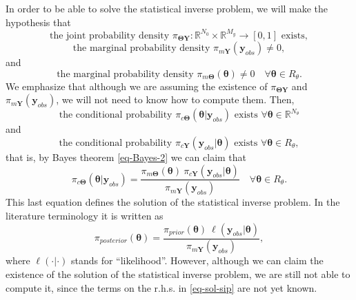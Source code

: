 In order to be able to solve the statistical inverse problem, we will make the hypothesis that
\begin{equation}\label{eq-hyp-jpd}
\mbox{the joint probability density }\pi_{\boldsymbol{\Theta}\mathbf{Y}}:\mathbb{R}^{N_0}\times\mathbb{R}^{M_y}\rightarrow[0,1]\mbox{ exists},
\end{equation}
\begin{equation}\label{eq-hyp-obs-mp}
\mbox{the marginal probability density }\pi_{m\mathbf{Y}}(\mathbf{y}_{obs})\neq 0,
\end{equation}
and
\begin{equation}\label{eq-hyp-theta-mp}
\mbox{the marginal probability density }\pi_{m\boldsymbol{\Theta}}(\boldsymbol{\theta})\neq 0\quad\forall\boldsymbol\theta\in R_{\theta}.
\end{equation}
We emphasize that although we are assuming the existence of
$\pi_{\boldsymbol{\Theta}\mathbf{Y}}$ and
$\pi_{m\mathbf{Y}}(\mathbf{y}_{obs})$,
we will not need to know how to compute them.
Then,
\begin{equation*}
\mbox{the conditional probability }\pi_{c\boldsymbol\Theta}(\boldsymbol\theta|\mathbf{y}_{obs})\mbox{ exists }\forall\boldsymbol\theta\in\mathbb{R}^{N_\theta}
\end{equation*}
and
\begin{equation*}
\mbox{the conditional probability }\pi_{c\mathbf{Y}}(\mathbf{y}_{obs}|\boldsymbol\theta)\mbox{ exists }\forall\boldsymbol\theta\in R_{\theta},
\end{equation*}
that is, by Bayes theorem \eqref{eq-Bayes-2} we can claim that
\begin{equation*}
\pi_{c\boldsymbol\Theta}(\boldsymbol\theta|\mathbf{y}_{obs})
=
\frac
{\pi_{m\boldsymbol{\Theta}}(\boldsymbol{\theta})~\pi_{c\mathbf{Y}}(\mathbf{y}_{obs}|\boldsymbol\theta)}
{\pi_{m\mathbf{Y}}(\mathbf{y}_{obs})}
\quad\forall\boldsymbol\theta\in R_{\theta}.
\end{equation*}
This last equation defines the solution of the statistical inverse problem. In the literature terminology it is written as
\begin{equation}\label{eq-sol-sip}
\pi_{posterior}(\boldsymbol\theta)
=
\frac
{\pi_{prior}(\boldsymbol{\theta})~\ell(\mathbf{y}_{obs}|\boldsymbol\theta)}
{\pi_{m\mathbf{Y}}(\mathbf{y}_{obs})},
\end{equation}
where $\ell(\cdot|\cdot)$ stands for ``likelihood''.
However, although we can claim the existence of the solution of the statistical inverse problem,
we are still not able to compute it, since the terms on the r.h.s. in \eqref{eq-sol-sip} are not yet known.
